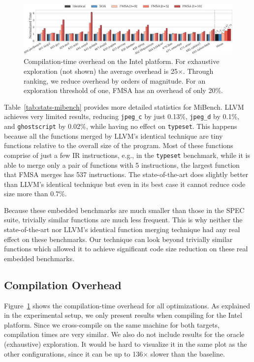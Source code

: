 \begin{figure}[t]
  \centering
  \includegraphics[width=\linewidth]{figs/compilation-time.pdf}
	\caption{Compilation-time overhead on the Intel platform. For exhaustive exploration (not shown) the average overhead is 25$\times$. Through ranking, we reduce overhead by orders of magnitude. For an exploration threshold of one, FMSA has an overhead of only 20\%.}
  \label{fig:compilation-time}
\end{figure}

Table~\ref{tab:stats-mibench} provides more detailed statistics for MiBench.
LLVM achieves very limited results, reducing \texttt{jpeg\_c} by just 0.13\%,
\texttt{jpeg\_d} by 0.1\%, and \texttt{ghostscript} by 0.02\%, while having no effect on \texttt{typeset}.
This happens because all the functions merged by LLVM's identical technique are tiny functions relative to the overall size of the program.
Most of these functions comprise of just a few IR instructions, e.g., in the \texttt{typeset} benchmark,
while it is able to merge only a pair of functions with 5 instructions, the largest function that FMSA merges has 537 instructions.
The state-of-the-art does slightly better than LLVM's identical technique but even in its best case it cannot reduce code size more than 0.7\%.

Because these embedded benchmarks are much smaller than those in the SPEC suite, trivially similar functions are much less frequent.
This is why neither the state-of-the-art nor LLVM's identical function merging technique had any real effect on these benchmarks.
Our technique can look beyond trivially similar functions which allowed it to achieve significant code size reduction on these real embedded benchmarks.

\subsection{Compilation Overhead}

Figure~\ref{fig:compilation-time} shows the compilation-time overhead for all optimizations. As explained in the experimental setup, we
only present results when compiling for the Intel platform. Since we cross-compile on the same machine for both targets, compilation times
are very similar. We also do not include results for the oracle (exhaustive) exploration. It would be hard to visualize it in the same plot
as the other configurations, since it can be up to 136$\times$ slower than the baseline.

